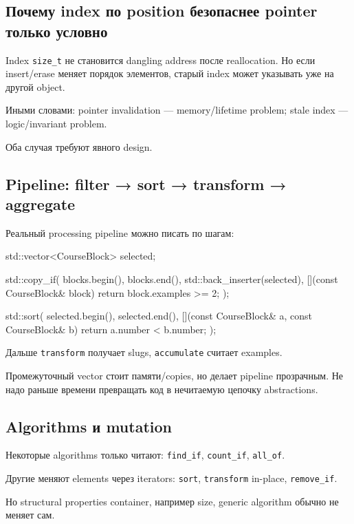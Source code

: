 \subsection{Почему index по position безопаснее pointer только условно}

Index \texttt{size\_t} не становится dangling address после reallocation.
Но если insert/erase меняет порядок элементов, старый index может указывать уже
на другой object.

Иными словами:
pointer invalidation --- memory/lifetime problem; stale index --- logic/invariant problem.

Оба случая требуют явного design.

\subsection{Pipeline: filter → sort → transform → aggregate}

Реальный processing pipeline можно писать по шагам:

\begin{cppcode}
std::vector<CourseBlock> selected;

std::copy_if(
    blocks.begin(),
    blocks.end(),
    std::back_inserter(selected),
    [](const CourseBlock& block) {
        return block.examples >= 2;
    }
);

std::sort(
    selected.begin(),
    selected.end(),
    [](const CourseBlock& a, const CourseBlock& b) {
        return a.number < b.number;
    }
);
\end{cppcode}

Дальше \texttt{transform} получает slugs, \texttt{accumulate} считает examples.

Промежуточный vector стоит памяти/copies, но делает pipeline прозрачным.
Не надо раньше времени превращать код в нечитаемую цепочку abstractions.

\subsection{Algorithms и mutation}

Некоторые algorithms только читают:
\texttt{find\_if}, \texttt{count\_if}, \texttt{all\_of}.

Другие меняют elements через iterators:
\texttt{sort}, \texttt{transform} in-place, \texttt{remove\_if}.

Но structural properties container, например size, generic algorithm обычно
не меняет сам.

